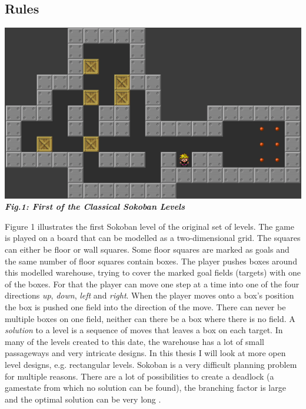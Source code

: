 \documentclass{article}
\begin{document}
\subsection{Rules}
\begin{center}
\includegraphics[scale=0.2]{SokobanLevel1}
\newline
\textbf{\textit{Fig.1: First of the Classical Sokoban Levels}}
\end{center}
Figure 1 illustrates the first Sokoban level of the original set of levels. The game is played on a board that can be modelled as a two-dimensional grid. The squares can either be floor or wall squares. Some floor squares are marked as goals and the same number of floor squares contain boxes. The player pushes boxes around this modelled warehouse, trying to cover the marked goal fields (targets) with one of the boxes. For that the player can move one step at a time into one of the four directions \textit{up}, \textit{down}, \textit{left} and \textit{right}. When the player moves onto a box's position the box is pushed one field into the direction of the move. There can never be multiple boxes on one field, neither can there be a box where there is no field. A \textit{solution} to a level is a sequence of moves that leaves a box on each target.
In many of the levels created to this date, the warehouse has a lot of small passageways and very intricate designs. In this thesis I will look at more open level designs, e.g. rectangular levels.
Sokoban is a very difficult planning problem for multiple reasons. There are a lot of possibilities to create a deadlock (a gamestate from which no solution can be found), the branching factor is large and the optimal solution can be very long \cite{BoteaHeuristicsVsPlanning}.

\end{document}
